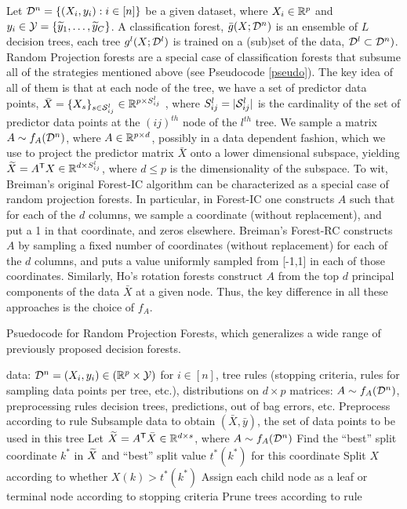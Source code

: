 \documentclass[10pt]{article}
\begin{document}
Let $\mathcal{D}^n=\{(X_i,y_i): i \in [n]\}$ be a given dataset, where $X_i \in \mathbb{R}^p$ and $y_i \in \mathcal{Y} = \{\widetilde{y}_1,\ldots, \widetilde{y}_C\}$. A classification forest, $\bar{g}(X; \mathcal{D}^n)$ is an ensemble of $L$ decision trees, each tree $g^l( X; \mathcal{D}^l)$ is trained on a (sub)set of the data, $\mathcal{D}^l \subset \mathcal{D}^n)$.
Random Projection forests are a special case of classification forests that subsume all of the strategies mentioned above (see Pseudocode \ref{pseudo}). The key idea of all of them is that at each node of the tree, we have a set of predictor data points, $\bar{X}=\{X_s\}_{s \in \mathcal{S}^l_{ij}} \in \mathbb{R}^{p \times S^l_{ij}}$ , where  $S^l_{ij}=|\mathcal{S}^l_{ij}|$ is the cardinality of the set of predictor data points at the $(ij)^{th}$ node of the $l^{th}$ tree.
We sample a matrix $A \sim f_A(\mathcal{D}^n)$, where $A \in \mathbb{R}^{p \times d}$, possibly in a data dependent fashion, which we use to project the predictor matrix $\bar{X}$ onto a lower dimensional subspace, yielding $\widetilde{X} = A^{\mathsf{T}} X \in \mathbb{R}^{d \times S^l_{ij}}$, where $d \leq p$ is the dimensionality of the subspace. To wit, Breiman's original Forest-IC algorithm can be characterized as a special case of random projection forests. In particular, in Forest-IC one constructs $A$ such that for each of the $d$ columns, we sample a coordinate (without replacement), and put a 1 in that coordinate, and zeros elsewhere. Breiman's Forest-RC constructs $A$ by sampling a fixed number of coordinates (without replacement) for each of the $d$ columns, and puts a value uniformly sampled from [-1,1] in each of those coordinates. Similarly, Ho's rotation forests construct $A$ from the top $d$ principal components of the data $\bar{X}$ at a given node. Thus, the key difference in all these approaches is the choice of $f_A$. 

\begin{algorithm}
  \caption{Psuedocode for Random Projection Forests, which generalizes a wide range of previously proposed decision forests.}
  \label{pseudo}
\begin{algorithmic}
   data: $\mathcal{D}^n = (X_i,y_i) \in (\mathbb{R}^p \times \mathcal{Y})$ for $i \in [n]$, tree rules (stopping criteria, rules for sampling data points per tree, etc.), distributions on $d \times p$ matrices: $A \sim f_A(\mathcal{D}^n)$, preprocessing rules
   decision trees, predictions, out of bag errors, etc. 
  \STATE Preprocess according to rule
  \STATE Subsample data to obtain $(\bar{X},\bar{y})$, the set of data points to be used in this tree
  \STATE Let $\widetilde{X} =  A^{\mathsf{T}} \bar{X} \in \mathbb{R}^{d \times s}$, where $A \sim f_A(\mathcal{D}^n)$
  \STATE Find the ``best'' split coordinate $k^*$ in $\widetilde{X}$ and ``best'' split value $t^*(k^*)$ for this coordinate
  \STATE Split $X$ according to whether $X(k) > t^*(k^*)$
  \STATE Assign each child node as a leaf or terminal  node according to stopping criteria
  \ENDFOR
  \ENDFOR
  \STATE Prune trees according to rule
\end{algorithmic}
\end{algorithm}
\end{document}
